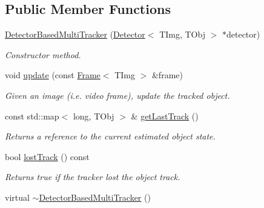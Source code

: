 \subsection*{Public Member Functions}
\begin{DoxyCompactItemize}
\item 
\hypertarget{class_vision_core_1_1_abstractions_1_1_detector_based_multi_tracker_a1a1d90f1a87b6b645974c711686c14da}{}\hyperlink{class_vision_core_1_1_abstractions_1_1_detector_based_multi_tracker_a1a1d90f1a87b6b645974c711686c14da}{Detector\+Based\+Multi\+Tracker} (\hyperlink{class_vision_core_1_1_interfaces_1_1_detector}{Detector}$<$ T\+Img, T\+Obj $>$ $\ast$detector)\label{class_vision_core_1_1_abstractions_1_1_detector_based_multi_tracker_a1a1d90f1a87b6b645974c711686c14da}

\begin{DoxyCompactList}\small\item\em Constructor method. \end{DoxyCompactList}\item 
\hypertarget{class_vision_core_1_1_abstractions_1_1_detector_based_multi_tracker_af1a54610c9af7fb54d00e4be2e75609e}{}void \hyperlink{class_vision_core_1_1_abstractions_1_1_detector_based_multi_tracker_af1a54610c9af7fb54d00e4be2e75609e}{update} (const \hyperlink{struct_vision_core_1_1_data_structures_1_1_frame}{Frame}$<$ T\+Img $>$ \&frame)\label{class_vision_core_1_1_abstractions_1_1_detector_based_multi_tracker_af1a54610c9af7fb54d00e4be2e75609e}

\begin{DoxyCompactList}\small\item\em Given an image (i.\+e. video frame), update the tracked object. \end{DoxyCompactList}\item 
const std\+::map$<$ long, T\+Obj $>$ \& \hyperlink{class_vision_core_1_1_abstractions_1_1_detector_based_multi_tracker_a9c8e82bfdf34a35ef2eee54006181e5b}{get\+Last\+Track} ()
\begin{DoxyCompactList}\small\item\em Returns a reference to the current estimated object state. \end{DoxyCompactList}\item 
bool \hyperlink{class_vision_core_1_1_abstractions_1_1_detector_based_multi_tracker_ac7e0977fa702f98038bbe303df458a6c}{lost\+Track} () const 
\begin{DoxyCompactList}\small\item\em Returns true if the tracker lost the object track. \end{DoxyCompactList}\item 
\hypertarget{class_vision_core_1_1_abstractions_1_1_detector_based_multi_tracker_ab6f751b645585a462d8d2faa6edfbd44}{}virtual \hyperlink{class_vision_core_1_1_abstractions_1_1_detector_based_multi_tracker_ab6f751b645585a462d8d2faa6edfbd44}{$\sim$\+Detector\+Based\+Multi\+Tracker} ()\label{class_vision_core_1_1_abstractions_1_1_detector_based_multi_tracker_ab6f751b645585a462d8d2faa6edfbd44}


\end{DoxyCompactItemize}

